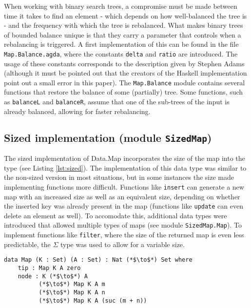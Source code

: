 \documentclass[a4paper,UKenglish,cleveref, autoref, thm-restate]{template/lipics-v2021}
\begin{document}
When working with binary search trees, a compromise must be made between time it takes to find an element - which depends on how well-balanced the tree is - and the frequency with which the tree is rebalanced. What makes binary trees of bounded balance unique is that they carry a parameter that controls when a rebalancing is triggered. A first implementation of this can be found in the file \texttt{Map.Balance.agda}, where the constants \texttt{delta} and \texttt{ratio} are introduced. The usage of these constants corresponds to the description given by Stephen Adams \cite{adams1993functional} (although it must be pointed out that the creators of the Haskell implementation point out a small error in this paper). The \texttt{Map.Balance} module contains several functions that restore the balance of some (partially) tree. Some functions, such as \texttt{balanceL} and \texttt{balanceR}, assume that one of the sub-trees of the input is already balanced, allowing for faster rebalancing.


\subsection{Sized implementation (module \texttt{SizedMap})}
The sized implementation of Data.Map incorporates the size of the map into the type (see Listing \ref{lst:sized}). The implementation of this data type was similar to the non-sized version in most situations, but in some instances the size made implementing functions more difficult. Functions like \texttt{insert} can generate a new map with an increased size as well as an equivalent size, depending on whether the inserted key was already present in the map (functions like \texttt{update} can even delete an element as well). To accomodate this, additional data types were introduced that allowed multiple types of maps (see module \texttt{SizedMap.Map}). To implement functions like \texttt{filter}, where the size of the returned map is even less predictable, the $\Sigma$ type was used to allow for a variable size.

\begin{lstlisting}[label=lst:sized,caption=Sized map. The size of a tip is zero. The size of a node is one plus the sum of the sizes of its children.]
  data Map (K : Set) (A : Set) : Nat (*$\to$*) Set where
    tip : Map K A zero
    node : K (*$\to$*) A
          (*$\to$*) Map K A m
          (*$\to$*) Map K A n
          (*$\to$*) Map K A (suc (m + n))
\end{lstlisting}
\end{document}
